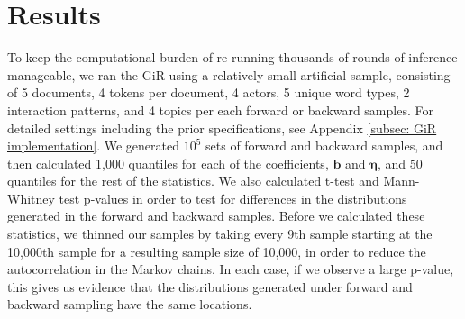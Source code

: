 \documentclass[a4paper]{article}
\begin{document}
\section{Results}
To keep the computational burden of re-running thousands of rounds of inference manageable, we ran the GiR using a relatively small artificial sample, consisting of 5 documents, 4 tokens per document, 4 actors, 5 unique word types, 2 interaction patterns, and 4 topics per each forward or backward samples. For detailed settings including the prior specifications, see Appendix \ref{subsec: GiR implementation}.
We generated $10^5$ sets of forward and backward samples, and then calculated 1,000 quantiles for each of the coefficients, $\boldsymbol{b}$ and $\boldsymbol{\eta}$, and 50 quantiles for the rest of the statistics. We also calculated t-test and Mann-Whitney test p-values in order to test for differences in the distributions generated in the forward and backward samples. Before we calculated these statistics, we thinned our samples by taking every 9th sample starting at the 10,000th sample for a resulting sample size of 10,000, in order to reduce the autocorrelation in the Markov chains. In each case, if we observe a large p-value, this gives us evidence that the distributions generated under forward and backward sampling have the same locations. 
\end{document}
